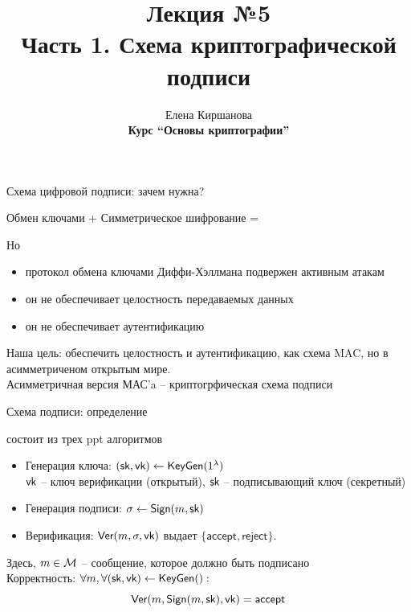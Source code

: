 \documentclass[usenames,dvipsnames,8pt,aspectratio=169]{beamer}
\title{Лекция №5 \\[10pt]
	Часть 1. Схема криптографической подписи}
\date{ Елена Киршанова \\  \textbf{Курс ``Основы криптографии''} \\  }
\begin{document}
	
\begin{frame}
	\titlepage
\end{frame}


\begin{frame}{Схема цифровой подписи: зачем нужна?}
	\large 
	\begin{center}
Обмен ключами + Симметрическое шифрование =  {\color{Orange}{конфидециальность} } 
	\end{center}
Но
	\begin{itemize}
		\itemsep 10pt
		\item протокол обмена ключами Диффи-Хэллмана {\color{Orange} подвержен активным атакам} 
		\item  он не обеспечивает {\color{Orange} целостность} передаваемых данных
		\item он не обеспечивает {\color{Orange} аутентификацию}
	\end{itemize}

\vspace{15pt}

Наша цель: обеспечить целостность и аутентификацию, как схема MAC,  но в асимметриченом  {\color{Orange} открытым} мире.\\[10pt]


\Large Асимметричная версия МАС'a -- {\color{Orange} криптогрфическая схема подписи}
\end{frame}



\begin{frame}{Схема подписи: определение}
\Large

{\color{Orange}{Схема подписи}} состоит из трех ppt алгоритмов
\begin{itemize}
	\itemsep 10pt
	\item Генерация ключа: $(\textsf{sk}, \textsf{vk}) \leftarrow \textsf{KeyGen}(1^\lambda)$ \\
	$\textsf{vk}$ -- ключ верификации (открытый), $\textsf{sk}$ -- подписывающий ключ (секретный)
	\item Генерация подписи: $\sigma \leftarrow \textsf{Sign}(m, \textsf{sk})$
	\item Верификация: $\textsf{Ver}(m, \sigma, \textsf{vk})$ выдает $\{\mathsf{accept}, \mathsf{reject}  \}$.
\end{itemize}
\vspace{15pt}
Здесь,  $m \in \mathcal{M}$ -- сообщение, которое должно быть подписано\\[10pt]

{\color{Orange}Корректность}: $\forall m, \forall (\textsf{sk}, \textsf{vk}) \leftarrow \textsf{KeyGen}():$ 
\[
	\textsf{Ver}(m, \textsf{Sign}(m, \textsf{sk}), \textsf{vk})  = \mathsf{accept}
\]
\end{frame}
\end{document}
